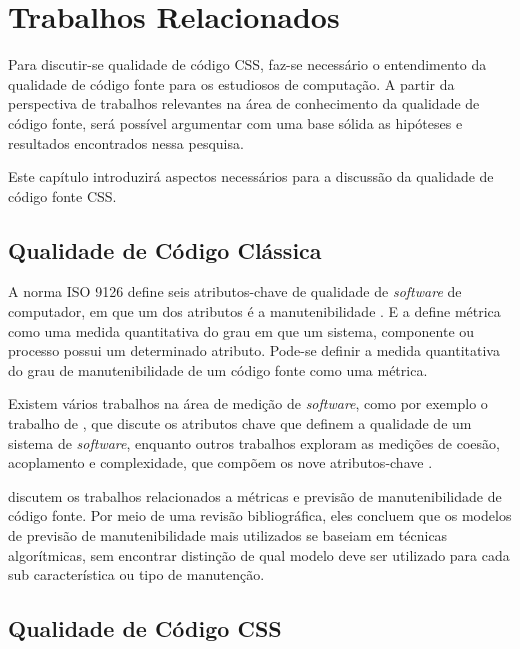 %
%

\chapter{Trabalhos Relacionados}

Para discutir-se qualidade de código CSS, faz-se necessário o entendimento da qualidade de código fonte para os estudiosos de computação. 
A partir da perspectiva de trabalhos relevantes na área de conhecimento da qualidade de código fonte, será possível argumentar com uma base sólida as hipóteses e resultados encontrados nessa pesquisa.

Este capítulo introduzirá aspectos necessários para a discussão da qualidade de código fonte CSS.

\section{Qualidade de Código Clássica}

A norma ISO 9126 define seis atributos-chave de qualidade de \textit{software} de computador, em que um dos atributos é a manutenibilidade \cite{Pressman:2010}. E a  define métrica como uma medida quantitativa do grau em que um sistema, componente ou processo possui um determinado atributo. Pode-se definir a medida quantitativa do grau de manutenibilidade de um código fonte como uma métrica.

Existem vários trabalhos na área de medição de \textit{software}, como por exemplo o trabalho de , que discute os atributos chave que definem a qualidade de um sistema de \textit{software}, enquanto outros trabalhos exploram as medições de coesão, acoplamento e complexidade, que compõem os nove atributos-chave \cite{McCabe:1989,Zuse:1991,Bieman1994,Dhama:1995,Zuse:1997} .

 discutem os trabalhos relacionados a métricas e previsão de manutenibilidade de código fonte. Por meio de uma revisão bibliográfica, eles concluem que os modelos de previsão de manutenibilidade mais utilizados se baseiam em técnicas algorítmicas, sem encontrar distinção de qual modelo deve ser utilizado para cada sub característica ou tipo de manutenção.

\section{Qualidade de Código CSS}

